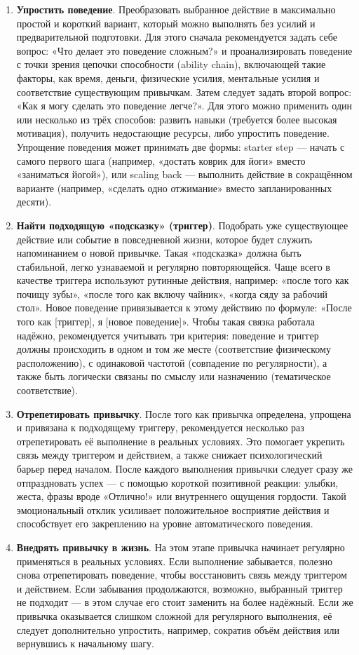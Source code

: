 \documentclass[pdflatex,sn-mathphys-num]{sn-jnl}%
\theoremstyle{thmstyleone}%
\theoremstyle{thmstyletwo}%
\theoremstyle{thmstylethree}%
\begin{document}
\begin{enumerate}
    \item \label{th:simlpify} \textbf{Упростить поведение}. Преобразовать выбранное действие в максимально простой и короткий вариант, который можно выполнять без усилий и предварительной подготовки. Для этого сначала рекомендуется задать себе вопрос: «Что делает это поведение сложным?» и проанализировать поведение с точки зрения цепочки способности (ability chain), включающей такие факторы, как время, деньги, физические усилия, ментальные усилия и соответствие существующим привычкам. Затем следует задать второй вопрос: «Как я могу сделать это поведение легче?». Для этого можно применить один или несколько из трёх способов: развить навыки (требуется более высокая мотивация), получить недостающие ресурсы, либо упростить поведение. Упрощение поведения может принимать две формы: starter step — начать с самого первого шага (например, «достать коврик для йоги» вместо «заниматься йогой»), или scaling back — выполнить действие в сокращённом варианте (например, «сделать одно отжимание» вместо запланированных десяти).
    \item \label{th:trigger} \textbf{Найти подходящую «подсказку» (триггер)}.  Подобрать уже существующее действие или событие в повседневной жизни, которое будет служить напоминанием о новой привычке. Такая «подсказка» должна быть стабильной, легко узнаваемой и регулярно повторяющейся. Чаще всего в качестве триггера используют рутинные действия, например: «после того как почищу зубы», «после того как включу чайник», «когда сяду за рабочий стол». Новое поведение привязывается к этому действию по формуле: «После того как [триггер], я [новое поведение]». Чтобы такая связка работала надёжно, рекомендуется учитывать три критерия: поведение и триггер должны происходить в одном и том же месте (соответствие физическому расположению), с одинаковой частотой (совпадение по регулярности), а также быть логически связаны по смыслу или назначению (тематическое соответствие).
    \item \label{th:repeat} \textbf{Отрепетировать привычку}. После того как привычка определена, упрощена и привязана к подходящему триггеру, рекомендуется несколько раз отрепетировать её выполнение в реальных условиях. Это помогает укрепить связь между триггером и действием, а также снижает психологический барьер перед началом. После каждого выполнения привычки следует сразу же отпраздновать успех — с помощью короткой позитивной реакции: улыбки, жеста, фразы вроде «Отлично!» или внутреннего ощущения гордости. Такой эмоциональный отклик усиливает положительное восприятие действия и способствует его закреплению на уровне автоматического поведения.
    \item \label{th:implement} \textbf{Внедрять привычку в жизнь}.  На этом этапе привычка начинает регулярно применяться в реальных условиях. Если выполнение забывается, полезно снова отрепетировать поведение, чтобы восстановить связь между триггером и действием. Если забывания продолжаются, возможно, выбранный триггер не подходит — в этом случае его стоит заменить на более надёжный. Если же привычка оказывается слишком сложной для регулярного выполнения, её следует дополнительно упростить, например, сократив объём действия или вернувшись к начальному шагу.
\end{enumerate}
\end{document}
